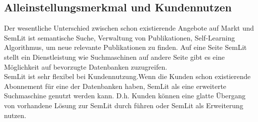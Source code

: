 \subsection{Alleinstellungsmerkmal und Kundennutzen}
Der wesentliche Unterschied zwischen schon existierende Angebote auf Markt und SemLit ist semantische Suche, Verwaltung von Publikationen, Self-Learning Algorithmus, um neue relevante Publikationen zu finden. Auf eine Seite SemLit stellt ein Dienstleistung wie Suchmaschinen auf andere Seite gibt es eine Möglichkeit auf bevorzugte Datenbanken zuzugreifen.\\
SemLit ist sehr flexibel bei Kundennutzung.Wenn die Kunden schon existierende Abonnement für eine der Datenbanken haben, SemLit als eine erweiterte Suchmaschine genutzt werden kann. D.h. Kunden können eine glatte Übergang von vorhandene Lösung zur SemLit durch führen oder SemLit als Erweiterung nutzen. 


